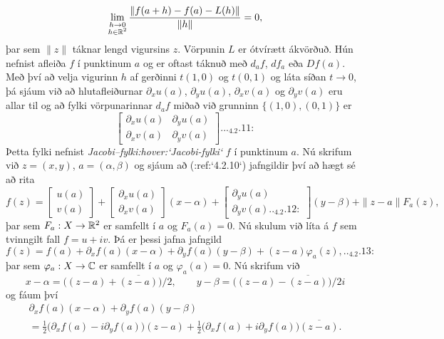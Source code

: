 \begin{equation} 
\lim_{\substack{h\to 0\\ h\in {\mathbb R}^2}}
\dfrac{\| f(a+h)-f(a)-L(h)\|}{\|h\|}= 0,
\end{equation}
þar sem $\|z\|$ táknar lengd vigursins $z$.  Vörpunin $L$ er ótvírætt
ákvörðuð.  Hún nefnist afleiða $f$ í punktinum $a$ og er oftast táknuð
með $d_af$, $df_a$ eða $Df(a)$.    Með því að velja vigurinn $h$ af
gerðinni $t(1,0)$ og $t(0,1)$ og láta síðan $t\to 0$, þá sjáum við að hlutafleiðurnar 
${\partial}_xu(a)$, ${\partial}_yu(a)$, ${\partial}_xv(a)$ og 
 ${\partial}_yv(a)$ eru allar til og að fylki vörpunarinnar $d_af$ miðað
við grunninn $\{(1,0), (0,1)\}$ er
\begin{equation*}
\left[\begin{matrix} 
{\partial}_xu(a) & {\partial}_yu(a)\\
{\partial}_xv(a) & {\partial}_yv(a)
\end{matrix}\right].


.. _4.2.11:

\end{equation*} 
Þetta fylki nefnist {\it Jacobi--fylki:hover:`Jacobi-fylki`} $f$ í punktinum $a$.  Nú skrifum
við $z=(x,y)$, $a=({\alpha},{\beta})$ og sjáum að (:ref:`4.2.10`) jafngildir
því að hægt sé að rita
\begin{equation*}
f(z)=\left[\begin{matrix}
u(a) \\ v(a)
\end{matrix}\right]+
\left[\begin{matrix}
{\partial}_xu(a) \\ {\partial}_xv(a)
\end{matrix}\right](x-{\alpha})+
\left[\begin{matrix}
{\partial}_yu(a) \\ {\partial}_yv(a)

.. _4.2.12:

\end{matrix}\right](y-{\beta})+
\|z-a\|F_a(z), 
\end{equation*}
þar sem $F_a:X\to {\mathbb R}^2$ er samfellt í $a$ og $F_a(a)=0$.  Nú skulum við
líta á $f$ sem tvinngilt fall $f=u+iv$.  Þá er þessi jafna jafngild
\begin{equation}
f(z)=f(a)+ {\partial}_xf(a)(x-{\alpha})+{\partial}_yf(a)(y-{\beta})
+(z-a)\varphi_a(z),


.. _4.2.13:

\end{equation}
þar sem $\varphi_a:X\to {\mathbb C}$ er samfellt í $a$ og $\varphi_a(a)=0$.  Nú
skrifum við 
$$
x-{\alpha}=\big((z-a)+\overline{(z-a)}\big)/2, \qquad
y-{\beta}=\big((z-a)-\overline{(z-a)}\big)/2i
$$ 
og fáum því 
\begin{multline*}
{\partial}_xf(a)(x-{\alpha})+{\partial}_yf(a)(y-{\beta})  \\
=\tfrac 12\big({\partial}_xf(a)-i{\partial}_yf(a)\big)(z-a)
+\tfrac 12\big({\partial}_xf(a)+i{\partial}_yf(a)\big)\overline{(z-a)}.
\end{multline*}


